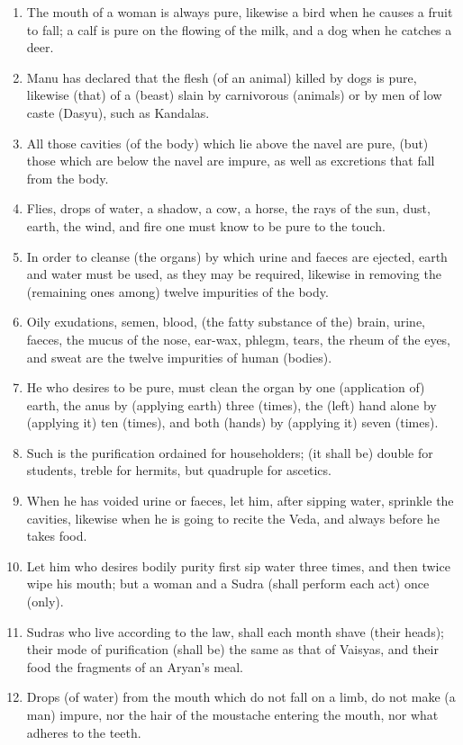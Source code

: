 \begin{enumerate}
\item The mouth of a woman is always pure, likewise a bird when he causes a fruit to fall; a calf is pure on the flowing of the milk, and a dog when he catches a deer.
\item Manu has declared that the flesh (of an animal) killed by dogs is pure, likewise (that) of a (beast) slain by carnivorous (animals) or by men of low caste (Dasyu), such as Kandalas.
\item All those cavities (of the body) which lie above the navel are pure, (but) those which are below the navel are impure, as well as excretions that fall from the body.
\item Flies, drops of water, a shadow, a cow, a horse, the rays of the sun, dust, earth, the wind, and fire one must know to be pure to the touch.
\item In order to cleanse (the organs) by which urine and faeces are ejected, earth and water must be used, as they may be required, likewise in removing the (remaining ones among) twelve impurities of the body.
\item Oily exudations, semen, blood, (the fatty substance of the) brain, urine, faeces, the mucus of the nose, ear-wax, phlegm, tears, the rheum of the eyes, and sweat are the twelve impurities of human (bodies).
\item He who desires to be pure, must clean the organ by one (application of) earth, the anus by (applying earth) three (times), the (left) hand alone by (applying it) ten (times), and both (hands) by (applying it) seven (times).
\item Such is the purification ordained for householders; (it shall be) double for students, treble for hermits, but quadruple for ascetics.
\item When he has voided urine or faeces, let him, after sipping water, sprinkle the cavities, likewise when he is going to recite the Veda, and always before he takes food.
\item Let him who desires bodily purity first sip water three times, and then twice wipe his mouth; but a woman and a Sudra (shall perform each act) once (only).
\item Sudras who live according to the law, shall each month shave (their heads); their mode of purification (shall be) the same as that of Vaisyas, and their food the fragments of an Aryan's meal.
\item Drops (of water) from the mouth which do not fall on a limb, do not make (a man) impure, nor the hair of the moustache entering the mouth, nor what adheres to the teeth.

\end{enumerate}
